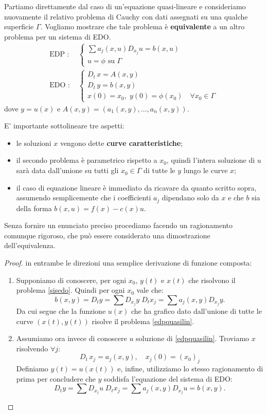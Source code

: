 Partiamo direttamente dal caso di un'equazione quasi-lineare e consideriamo nuovamente il relativo problema di Cauchy con dati assegnati su una qualche superficie $\Gamma$. Vogliamo mostrare che tale problema è \textbf{equivalente} a un altro problema per un sistema di EDO.
\begin{align} 
\label{edpquasilin}
\text{EDP : }&
\begin{cases}
\sum a_j(x,u)D_{x_j} u = b(x,u)\\
u = \phi \text{ su } \Gamma
\end{cases} \\ 
\label{sisedo}
\text{EDO : }&
\begin{cases}
D_t \, x = A(x,y) \; \\
D_t \, y = b(x,y)\\ 
x(0)=x_0, \; y(0) = \phi (x_0) \quad \forall x_0 \in \Gamma
\end{cases} 
\end{align}
dove $y = u(x)$ e $A(x,y)=(a_1(x,y),\ldots ,a_n(x,y))$.
\begin{remark}
E' importante sottolineare tre aspetti:
\begin{itemize}
\item le soluzioni $x$ vengono dette \textbf{curve caratteristiche};
\item il secondo problema è parametrico rispetto a $x_0$, quindi l'intera soluzione di $u$ sarà data dall'unione su tutti gli $x_0\in \Gamma$ di tutte le $y$ lungo le curve $x$;
\item il caso di equazione lineare è immediato da ricavare da quanto scritto sopra, assumendo semplicemente che i coefficienti $a_j$ dipendano solo da $x$ e che $b$ sia della forma $b(x,u)=f(x)-c(x)u$.
\end{itemize}
\end{remark}
Senza fornire un enunciato preciso procediamo facendo un ragionamento comunque rigoroso, che può essere considerato una dimostrazione dell'equivalenza.
\begin{proof}
in entrambe le direzioni una semplice derivazione di funzione composta:
\begin{enumerate}
\item Supponiamo di conoscere, per ogni $x_0$, $y(t)$ e $x(t)$ che risolvono il problema \eqref{sisedo}. Quindi per ogni $x_0$ vale che:
$$b(x,y) = D_t y = \sum D_{x_j} y \; D_t x_j = \sum a_j(x,y) D_{x_j} y.$$
Da cui segue che la funzione $u(x)$ che ha grafico dato dall'unione di tutte le curve $(x(t),y(t))$ risolve il problema \eqref{edpquasilin}.
\item Assumiamo ora invece di conoscere $u$ soluzione di \eqref{edpquasilin}. Troviamo $x$ risolvendo $\forall j$:
\begin{equation*} \label{sys}
D_t \, x_j = a_j(x,y), \quad x_j(0)=(x_0)_j 
\end{equation*}
Definiamo $y(t)=u(x(t))$ e, infine, utilizziamo lo stesso ragionamento di prima per concludere che $y$ soddisfa l'equazione del sistema di EDO:
$$D_t y = \sum D_{x_j} u \; D_t x_j = \sum  a_j(x,y)D_{x_j} u = b(x,y).$$
\qedhere
\end{enumerate}
\end{proof}

